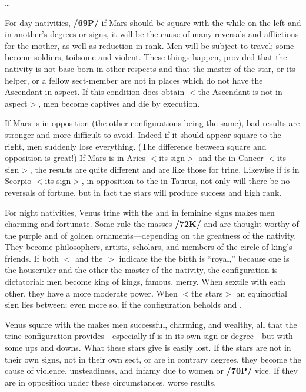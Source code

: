 \ldots

For day nativities, \textbf{/69P/} if Mars \marginnote{\Mars \Square \Moon} should be square with the \Moon\xspace while on the left and in another’s degrees or signs, it will be the cause of many reversals and afflictions for the mother, as well as reduction in rank. Men will be subject to travel; some become soldiers, toilsome and violent. These things happen, provided that the nativity is not base-born in other respects and that the master of the star, or its helper, or a fellow sect-member are not in places which do not have the Ascendant in aspect. If this condition does
obtain $<$the Ascendant is not in aspect$>$, men become captives and die by execution. 

If Mars is in opposition (the other configurations being the same), bad results are stronger and more difficult to avoid. Indeed if it should appear square to the right, men suddenly lose everything. (The difference between square and opposition is great!) \mndl If Mars is in Aries $<$its sign$>$ and the \Moon\xspace in Cancer $<$its sign$>$, the results are quite different and are like those for trine. Likewise if \Mars\xspace is in Scorpio $<$its sign$>$, in opposition to the \Moon\xspace in Taurus, not only will there be no reversals of fortune, but in fact the stars will produce success and high rank.

For night nativities, Venus \marginnote{\Venus \Trine \Moon} trine with the \Moon\xspace and in feminine signs makes men charming and fortunate. Some rule the masses \textbf{/72K/} and are thought worthy of the purple and of golden ornaments—depending on the greatness of the nativity. They become philosophers, artists, scholars, and members of
the circle of king’s friends. If both $<$\Venus\xspace and the \Moon$>$ indicate the the birth is “royal,” because one is
the houseruler and the other the master of the nativity, the configuration is dictatorial: men become king of kings, famous, merry. When sextile with each other, they have a more moderate power. When $<$the stars$>$ an equinoctial sign lies between; even more so, if the configuration beholds \Pisces\xspace and \Taurus.

Venus \marginnote{\Venus \Square \Moon} square with the \Moon\xspace makes men successful, charming, and wealthy, all that the trine configuration provides—especially if \Venus\xspace is in its own sign or degree—but with some ups and downs. \mndl What these stars give is easily lost. If the stars are not in their own signs, not in their own sect, or are in contrary degrees, they become the cause of violence, unsteadiness, and infamy due to women or \textbf{/70P/} vice.
If they are in opposition under these circumstances, worse results.

